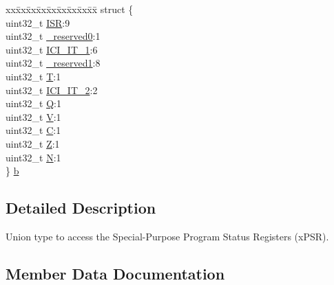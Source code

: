 \begin{DoxyCompactItemize}
\begin{tabbing}
\end{tabbing}\item 
\begin{tabbing}
xx\=xx\=xx\=xx\=xx\=xx\=xx\=xx\=xx\=\kill
struct \{\\
\>uint32\_t \mbox{\hyperlink{unionx_p_s_r___type_a3e9120dcf1a829fc8d2302b4d0673970}{ISR}}:9\\
\>uint32\_t \mbox{\hyperlink{unionx_p_s_r___type_af438e0f407357e914a70b5bd4d6a97c5}{\_reserved0}}:1\\
\>uint32\_t \mbox{\hyperlink{unionx_p_s_r___type_aa57a08ddc8ac3ee066e88dfddc3aa72a}{ICI\_IT\_1}}:6\\
\>uint32\_t \mbox{\hyperlink{unionx_p_s_r___type_a790056bb6f20ea16cecc784b0dd19ad6}{\_reserved1}}:8\\
\>uint32\_t \mbox{\hyperlink{unionx_p_s_r___type_a7eed9fe24ae8d354cd76ae1c1110a658}{T}}:1\\
\>uint32\_t \mbox{\hyperlink{unionx_p_s_r___type_adf3639bb7c6e54e5712f2ddef46a702e}{ICI\_IT\_2}}:2\\
\>uint32\_t \mbox{\hyperlink{unionx_p_s_r___type_add7cbd2b0abd8954d62cd7831796ac7c}{Q}}:1\\
\>uint32\_t \mbox{\hyperlink{unionx_p_s_r___type_af14df16ea0690070c45b95f2116b7a0a}{V}}:1\\
\>uint32\_t \mbox{\hyperlink{unionx_p_s_r___type_a40213a6b5620410cac83b0d89564609d}{C}}:1\\
\>uint32\_t \mbox{\hyperlink{unionx_p_s_r___type_a1e5d9801013d5146f2e02d9b7b3da562}{Z}}:1\\
\>uint32\_t \mbox{\hyperlink{unionx_p_s_r___type_a2db9a52f6d42809627d1a7a607c5dbc5}{N}}:1\\
\} \mbox{\hyperlink{unionx_p_s_r___type_aae3b3a834b3e9b13d5e7191d74d40eed}{b}}\\

\end{tabbing}\end{DoxyCompactItemize}


\subsection{Detailed Description}
Union type to access the Special-\/\+Purpose Program Status Registers (x\+P\+SR). 

\subsection{Member Data Documentation}
\mbox{\label{unionx_p_s_r___type_af438e0f407357e914a70b5bd4d6a97c5}} 
